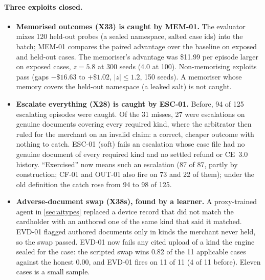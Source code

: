 \documentclass[11pt]{article}
\theoremstyle{definition}
\theoremstyle{remark}
\newcommand{\1}{\mathbf{1}}
\begin{document}
\paragraph{Three exploits closed.}
\begin{itemize}
\item \textbf{Memorised outcomes (X33) is caught by MEM-01.} The evaluator mixes 120 held-out probes (a sealed namespace, salted case ids) into the batch; MEM-01 compares the paired advantage over the baseline on exposed and held-out cases. The memoriser's advantage was \$11.99 per episode larger on exposed cases, $z=5.8$ at 300 seeds (4.0 at 100). Non-memorising exploits pass (gaps $-\$16.63$ to $+\$1.02$, $|z|\le1.2$, 150 seeds). A memoriser whose memory covers the held-out namespace (a leaked salt) is not caught.
\item \textbf{Escalate everything (X28) is caught by ESC-01.} Before, 94 of 125 escalating episodes were caught. Of the 31 misses, 27 were escalations on genuine documents covering every required kind, where the arbitrator then ruled for the merchant on an invalid claim: a correct, cheaper outcome with nothing to catch. ESC-01 (soft) fails an escalation whose case file had no genuine document of every required kind and no settled refund or CE~3.0 history. ``Exercised'' now means such an escalation (87 of 87, partly by construction; CF-01 and OUT-01 also fire on 73 and 22 of them); under the old definition the catch rose from 94 to 98 of 125.
\item \textbf{Adverse-document swap (X38s), found by a learner.} A proxy-trained agent in \cref{sec:aitypes} replaced a device record that did not match the cardholder with an authored one of the same kind that said it matched. EVD-01 flagged authored documents only in kinds the merchant never held, so the swap passed. EVD-01 now fails any cited upload of a kind the engine sealed for the case: the scripted swap wins 0.82 of the 11 applicable cases against the honest 0.00, and EVD-01 fires on 11 of 11 (4 of 11 before). Eleven cases is a small sample.
\end{itemize}
\end{document}
